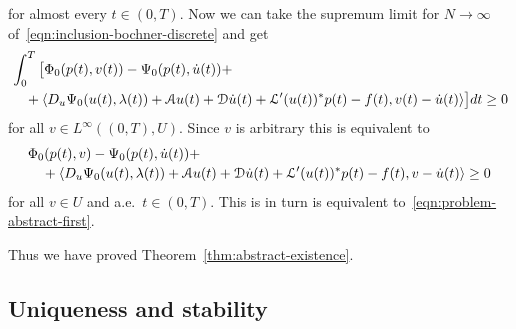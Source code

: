 \documentclass[a4paper,10pt,oneside]{amsbook}
\numberwithin{section}{chapter}
\numberwithin{equation}{chapter}
\theoremstyle{definition}
\DeclarePairedDelimiter{\dual}{\langle}{\rangle}
\begin{document}
for almost every $t\in(0,T)$. Now we can take the supremum limit for $N\to\infty$ of~\eqref{eqn:inclusion-bochner-discrete} and get
\begin{equation}
\label{eqn:inclusion-bochner}
\begin{multlined}
\int_0^T\big[\Phi_0(p(t),v(t))-\Psi_0(p(t),\dot u(t))+\\
+\dual{D_u\Psi_0(u(t),\lambda(t))+\mathcal{A}u(t)+\mathcal{D}\dot u(t)+\mathcal{L}'(u(t))^*p(t)-f(t),v(t)-\dot u(t)}\big]dt\ge0
\end{multlined}
\end{equation}
for all $v\in L^\infty((0,T),U)$. Since $v$ is arbitrary this is equivalent to
\begin{equation}
\label{eqn:explicit-inclusion}
\begin{multlined}
\Phi_0(p(t),v)-\Psi_0(p(t),\dot u(t))+\\
+\dual{D_u\Psi_0(u(t),\lambda(t))+\mathcal{A}u(t)+\mathcal{D}\dot u(t)+\mathcal{L}'(u(t))^*p(t)-f(t),v-\dot u(t)}\ge0
\end{multlined}
\end{equation}
for all $v\in U$ and a.e.\ $t\in(0,T)$. This is in turn is equivalent to~\eqref{eqn:problem-abstract-first}.

Thus we have proved Theorem~\ref{thm:abstract-existence}.

\subsection{Uniqueness and stability}
\end{document}
